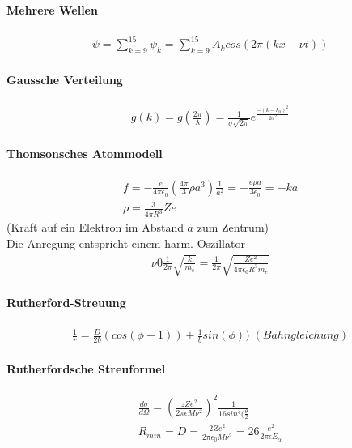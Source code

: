 \documentclass[10pt,a4paper]{article}
\begin{document}
\paragraph{Mehrere Wellen}$\,$ \\
\begin{align}
\psi = \sum_{k=9}^{15} \psi_k = \sum_{k=9}^{15} A_k cos(2\pi (kx- \nu t))
\end{align}
\paragraph{Gaussche Verteilung}$\,$ \\
\begin{align}
g(k)=g\left(\frac{2\pi}{\lambda}\right)=\frac{1}{\sigma \sqrt{2\pi}} e^{\frac{-(k-k_0)^2}{2\sigma^2}}
\end{align}
\paragraph{Thomsonsches Atommodell}$\,$ \\
\begin{align}
f= -\frac{e}{4\pi \epsilon_0}\left(\frac{4\pi}{3} \rho a^3\right)\frac{1}{a^2} = -\frac{e\rho a}{3 \epsilon_0}=-ka \\
\rho = \frac{3}{4\pi R^3}Ze
\end{align}
(Kraft auf ein Elektron im Abstand $a$ zum Zentrum)\\
Die Anregung entspricht einem harm. Oszillator
\begin{align}
\nu 0 \frac{1}{2\pi} \sqrt{\frac{k}{m_e}}=\frac{1}{2\pi}\sqrt{\frac{Ze^2}{4\pi \epsilon_0 R^3 m_e}}
\end{align}
\paragraph{Rutherford-Streuung}$\,$\\
\begin{align}
\frac{1}{r}=\frac{D}{2b} (cos(\phi -1))+\frac{1}{b}sin(\phi))\; (Bahngleichung)
\end{align}
\paragraph{Rutherfordsche Streuformel}$\,$\\
\begin{align}
\frac{d\sigma}{d\Omega}= \left(\frac{zZe^2}{2\pi \epsilon M \nu^2}\right)^2\frac{1}{16 sin^4(\frac{\theta}{2}}\\
R_{min} = D = \frac{2Ze^2}{2\pi \epsilon_0 M \nu^2} =26 \frac{e^2}{2\pi \epsilon E_\alpha}
\end{align}
\end{document}
